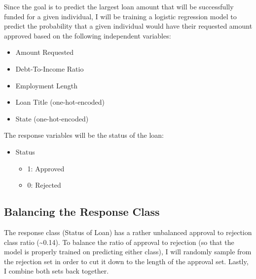 \documentclass[11pt]{article}
\providecommand{\tightlist}{%
      \setlength{\itemsep}{0pt}\setlength{\parskip}{0pt}}
\begin{document}
Since the goal is to predict the largest loan amount that will be
successfully funded for a given individual, I will be training a
logistic regression model to predict the probability that a given
individual would have their requested amount approved based on the
following independent variables:

\begin{itemize}
\tightlist
\item
  Amount Requested
\item
  Debt-To-Income Ratio
\item
  Employment Length
\item
  Loan Title (one-hot-encoded)
\item
  State (one-hot-encoded)
\end{itemize}

The response variables will be the status of the loan:

\begin{itemize}
\tightlist
\item
  Status

  \begin{itemize}
  \tightlist
  \item
    1: Approved
  \item
    0: Rejected
  \end{itemize}
\end{itemize}

    \subsection{Balancing the Response Class}

The response class (Status of Loan) has a rather unbalanced approval to
rejection class ratio (\textasciitilde{}0.14). To balance the ratio of
approval to rejection (so that the model is properly trained on
predicting either class), I will randomly sample from the rejection set
in order to cut it down to the length of the approval set. Lastly, I
combine both sets back together.
\end{document}
